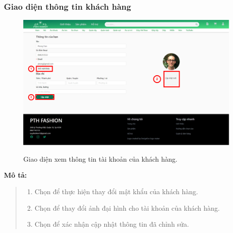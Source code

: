     \subsubsection{Giao diện thông tin khách hàng}
    \begin{figure}[!htp]
        \centering
        \includegraphics[width=5in]{img/UI/new_customer/customer_info.png}
        \label{15}
        \newline
        \caption{Giao diện xem thông tin tài khoản của khách hàng.}
    \end{figure}
    \textbf{Mô tả:}  
    \begin{quote}
        \begin{enumerate}
            \item Chọn để thực hiện thay đổi mật khẩu của khách hàng.
            \item Chọn để thay đổi ảnh đại hình cho tài khoản của khách hàng.
            \item Chọn để xác nhận cập nhật thông tin đã chỉnh sửa.
        \end{enumerate}
    \end{quote}  
   
